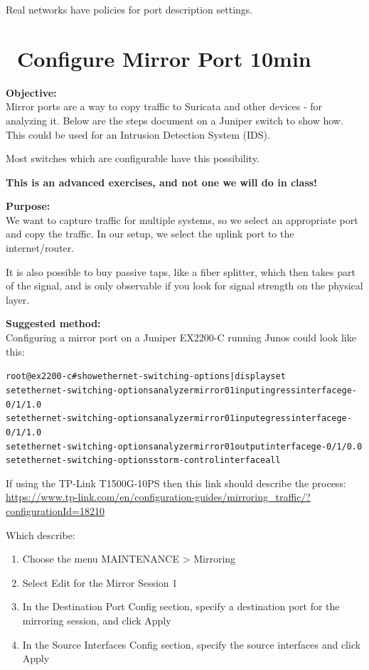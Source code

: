 \documentclass[a4paper,11pt,notitlepage]{report}
\begin{document}
Real networks have policies for port description settings.



\chapter{\faInfoCircle\ Configure Mirror Port 10min}
\label{ex:mirrorport}


{\bf Objective:} \\
Mirror ports are a way to copy traffic to Suricata and other devices - for analyzing it. Below are the steps document on a Juniper switch to show how. This could be used for an Intrusion Detection System (IDS).

Most switches which are configurable have this possibility.

{\bf This is an advanced exercises, and not one we will do in class!}

{\bf Purpose:}\\
We want to capture traffic for multiple systems, so we select an appropriate port and copy the traffic. In our setup, we select the uplink port to the internet/router.

It is also possible to buy passive taps, like a fiber splitter, which then takes part of the signal, and is only observable if you look for signal strength on the physical layer.


{\bf Suggested method:}\\
Configuring a mirror port on a Juniper EX2200-C running Junos could look like this:

\begin{alltt}\footnotesize
root@ex2200-c# show ethernet-switching-options | display set
set ethernet-switching-options analyzer mirror01 input ingress interface ge-0/1/1.0
set ethernet-switching-options analyzer mirror01 input egress interface ge-0/1/1.0
set ethernet-switching-options analyzer mirror01 output interface ge-0/1/0.0
set ethernet-switching-options storm-control interface all
\end{alltt}


If using the TP-Link T1500G-10PS then this link should describe the process:\\
{\small\url{https://www.tp-link.com/en/configuration-guides/mirroring_traffic/?configurationId=18210}}

Which describe:
\begin{enumerate}
\item Choose the menu MAINTENANCE > Mirroring
\item Select Edit for the Mirror Session 1
\item In the Destination Port Config section, specify a destination port for the mirroring session, and click Apply
\item In the Source Interfaces Config section, specify the source interfaces and click Apply
\end{enumerate}
\end{document}

